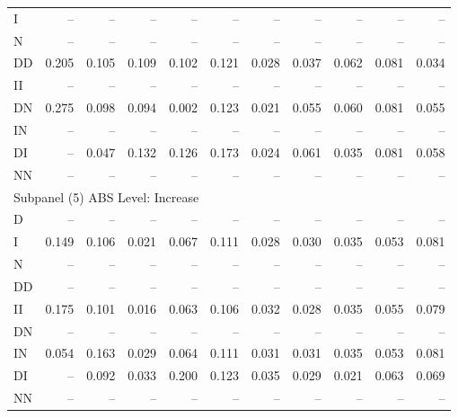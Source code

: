 {\begin{tabular}{lrrrrrrrrrr}
	I      &    -- &    -- &    -- &    -- &     -- &     -- &     -- &     -- &     -- &     -- \\
	N      &    -- &    -- &    -- &    -- &     -- &     -- &     -- &     -- &     -- &     -- \\
	DD     & 0.205 & 0.105 & 0.109 & 0.102 &  0.121 &  0.028 &  0.037 &  0.062 &  0.081 &  0.034 \\
	II     &    -- &    -- &    -- &    -- &     -- &     -- &     -- &     -- &     -- &     -- \\
	DN     & 0.275 & 0.098 & 0.094 & 0.002 &  0.123 &  0.021 &  0.055 &  0.060 &  0.081 &  0.055 \\
	IN     &    -- &    -- &    -- &    -- &     -- &     -- &     -- &     -- &     -- &     -- \\
	DI     &    -- & 0.047 & 0.132 & 0.126 &  0.173 &  0.024 &  0.061 &  0.035 &  0.081 &  0.058 \\
	NN     &    -- &    -- &    -- &    -- &     -- &     -- &     -- &     -- &     -- &     -- \\ \hline
	\multicolumn{11}{l}{Subpanel (5) ABS Level: Increase}                                        \\ \hline
	D      &    -- &    -- &    -- &    -- &     -- &     -- &     -- &     -- &     -- &     -- \\
	I      & 0.149 & 0.106 & 0.021 & 0.067 &  0.111 &  0.028 &  0.030 &  0.035 &  0.053 &  0.081 \\
	N      &    -- &    -- &    -- &    -- &     -- &     -- &     -- &     -- &     -- &     -- \\
	DD     &    -- &    -- &    -- &    -- &     -- &     -- &     -- &     -- &     -- &     -- \\
	II     & 0.175 & 0.101 & 0.016 & 0.063 &  0.106 &  0.032 &  0.028 &  0.035 &  0.055 &  0.079 \\
	DN     &    -- &    -- &    -- &    -- &     -- &     -- &     -- &     -- &     -- &     -- \\
	IN     & 0.054 & 0.163 & 0.029 & 0.064 &  0.111 &  0.031 &  0.031 &  0.035 &  0.053 &  0.081 \\
	DI     &    -- & 0.092 & 0.033 & 0.200 &  0.123 &  0.035 &  0.029 &  0.021 &  0.063 &  0.069 \\
	NN     &    -- &    -- &    -- &    -- &     -- &     -- &     -- &     -- &     -- &     -- \\ \hline\hline
\end{tabular}}

